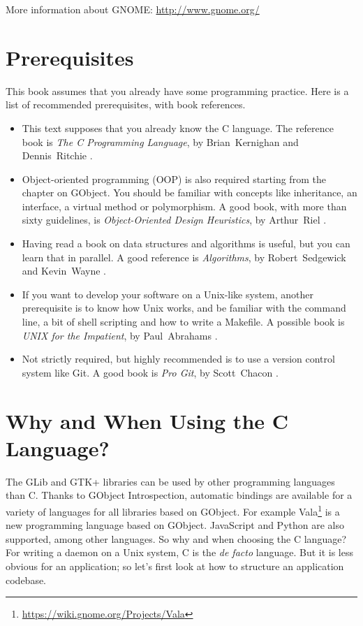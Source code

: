 More information about GNOME: \url{http://www.gnome.org/}

\section{Prerequisites}

This book assumes that you already have some programming practice. Here is a list of recommended prerequisites, with book references.

\begin{itemize}
  \item This text supposes that you already know the C language. The reference book is \emph{The C Programming Language}, by Brian~Kernighan and Dennis~Ritchie \cite{k-r-book}.

  \item Object-oriented programming (OOP) is also required starting from the chapter on GObject. You should be familiar with concepts like inheritance, an interface, a virtual method or polymorphism. A good book, with more than sixty guidelines, is \emph{Object-Oriented Design Heuristics}, by Arthur~Riel \cite{oop-book}.

  \item Having read a book on data structures and algorithms is useful, but you can learn that in parallel. A good reference is \emph{Algorithms}, by Robert~Sedgewick and Kevin~Wayne \cite{algo-book}.

  \item If you want to develop your software on a Unix-like system, another prerequisite is to know how Unix works, and be familiar with the command line, a bit of shell scripting and how to write a Makefile. A possible book is \emph{UNIX for the Impatient}, by Paul~Abrahams \cite{unix-impatient}.

  \item Not strictly required, but highly recommended is to use a version control system like Git. A good book is \emph{Pro Git}, by Scott~Chacon \cite{pro-git}.
\end{itemize}

\section{Why and When Using the C Language?}

The GLib and GTK+ libraries can be used by other programming languages than C. Thanks to GObject Introspection, automatic bindings are available for a variety of languages for all libraries based on GObject. For example Vala\footnote{\url{https://wiki.gnome.org/Projects/Vala}} is a new programming language based on GObject. JavaScript and Python are also supported, among other languages. So why and when choosing the C language? For writing a daemon on a Unix system, C is the \emph{de facto} language. But it is less obvious for an application; so let's first look at how to structure an application codebase.

